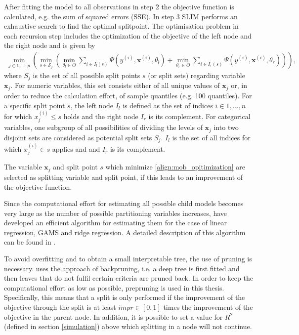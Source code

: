After fitting the model to all observations in step 2 the  objective function is calculated, e.g. the sum of squared errors (SSE).
In step 3 SLIM performs an exhaustive search to find the optimal splitpoint.  
The optimisation problem in each recursion step includes the optimization of the objective of the left node and the right node and is given by \begin{align} \label{align:mob_opitimization}
    \min_{j \in 1,..., p} \left( \min_{s \in \mathcal{S}_j} \left(\min_{\theta_{l} \in \Theta}\sum_{i \in I_{l}(s)}\Psi(y^{(i)}, \mathbf{x}^{(i)}, \theta_{l})  +  \min_{\theta_{r} \in \Theta}\sum_{i \in I_{r}(s)}\Psi(y^{(i)}, \mathbf{x}^{(i)}, \theta_{r}) \right) \right),
\end{align}
where ${S}_j$ is the set of all possible split points $s$ (or split sets) regarding variable $\mathbf{x}_j$. For numeric variables, this set consists either of all unique values of $\mathbf{x}_j$ or, in order to reduce the calculation effort, of sample quantiles (e.g. 100 quantiles). For a specific split point $s$, the left node $I_{l}$ is defined as the set of indices $i \in 1,...,n$ for which $x_j^{(i)} \leq s$ holds and the right node $I_{r}$ is its complement. For categorical variables, one subgroup of all possibilities of dividing the levels of $\mathbf{x}_j$ into two disjoint sets are considered as potential split sets $S_j$. $I_l$ is  the set of all indices for which $x_j^{(i)} \in s$ applies and and $I_{r}$ is its complement.

The variable $\mathbf{x}_j$ and split point $s$ which minimize  \ref{align:mob_opitimization} are selected as splitting variable and split point, if this leads to an improvement of the objective function.

Since the computational effort for estimating all possible child models becomes very large as the number of possible partitioning variables increases, \citep{Hu.2020} have developed an efficient algorithm for estimating them for the case of linear regression, GAMS and ridge regression. A detailed description of this algorithm can be found in \citep{Hu.2020}.

To avoid overfitting and to obtain a small interpretable tree, the use of pruning is necessary. \citep{Hu.2020} uses the approach of backpruning, i.e. a deep tree is first fitted and then leaves that do not fulfil certain criteria are pruned back. 
In order to keep the computational effort as low as possible, prepruning is used in this thesis. Specifically, this means that a split is only performed if the improvement of the objective through the split is at least $impr \in [0,1]$ times the improvement of the objective in the parent node. In addition, it is possible to set a value for $R^2$ (defined in section \ref{simulation}) above which splitting in a node will not continue.










